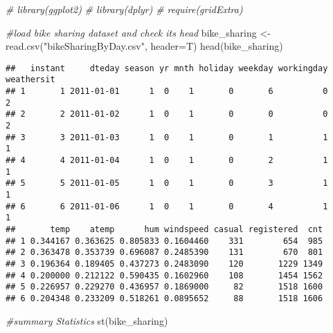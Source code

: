 \documentclass[
]{article}
\newenvironment{Shaded}{\begin{snugshade}}{\end{snugshade}}
\newcommand{\AttributeTok}[1]{\textcolor[rgb]{0.77,0.63,0.00}{#1}}
\newcommand{\CommentTok}[1]{\textcolor[rgb]{0.56,0.35,0.01}{\textit{#1}}}
\newcommand{\FunctionTok}[1]{\textcolor[rgb]{0.00,0.00,0.00}{#1}}
\newcommand{\NormalTok}[1]{#1}
\newcommand{\OtherTok}[1]{\textcolor[rgb]{0.56,0.35,0.01}{#1}}
\newcommand{\StringTok}[1]{\textcolor[rgb]{0.31,0.60,0.02}{#1}}
\begin{document}
\begin{Shaded}
\begin{Highlighting}[]
\CommentTok{\# library(ggplot2)}
\CommentTok{\# library(dplyr)}
\CommentTok{\# require(gridExtra)}
\end{Highlighting}
\end{Shaded}

\begin{Shaded}
\begin{Highlighting}[]
\CommentTok{\#load bike sharing dataset and check its head}
\NormalTok{bike\_sharing }\OtherTok{\textless{}{-}} \FunctionTok{read.csv}\NormalTok{(}\StringTok{"bikeSharingByDay.csv"}\NormalTok{, }\AttributeTok{header=}\NormalTok{T)}
\FunctionTok{head}\NormalTok{(bike\_sharing)}
\end{Highlighting}
\end{Shaded}

\begin{verbatim}
##   instant     dteday season yr mnth holiday weekday workingday weathersit
## 1       1 2011-01-01      1  0    1       0       6          0          2
## 2       2 2011-01-02      1  0    1       0       0          0          2
## 3       3 2011-01-03      1  0    1       0       1          1          1
## 4       4 2011-01-04      1  0    1       0       2          1          1
## 5       5 2011-01-05      1  0    1       0       3          1          1
## 6       6 2011-01-06      1  0    1       0       4          1          1
##       temp    atemp      hum windspeed casual registered  cnt
## 1 0.344167 0.363625 0.805833 0.1604460    331        654  985
## 2 0.363478 0.353739 0.696087 0.2485390    131        670  801
## 3 0.196364 0.189405 0.437273 0.2483090    120       1229 1349
## 4 0.200000 0.212122 0.590435 0.1602960    108       1454 1562
## 5 0.226957 0.229270 0.436957 0.1869000     82       1518 1600
## 6 0.204348 0.233209 0.518261 0.0895652     88       1518 1606
\end{verbatim}

\begin{Shaded}
\begin{Highlighting}[]
\CommentTok{\#summary Statistics}
\FunctionTok{st}\NormalTok{(bike\_sharing)}
\end{Highlighting}
\end{Shaded}
\end{document}
